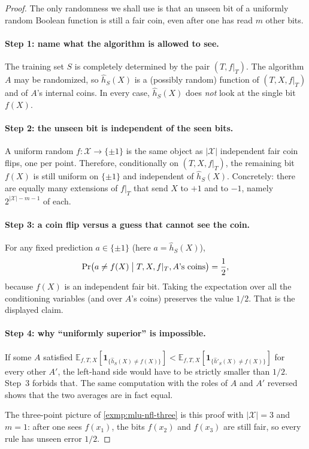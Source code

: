 \begin{proof}
The only randomness we shall use is that an unseen bit of a uniformly random Boolean function is still a fair coin, even after one has read $m$ other bits.

\paragraph{Step 1: name what the algorithm is allowed to see.}
The training set $S$ is completely determined by the pair $(T,f|_T)$. The algorithm $A$ may be randomized, so $\widehat h_S(X)$ is a (possibly random) function of $(T,X,f|_T)$ and of $A$'s internal coins. In every case, $\widehat h_S(X)$ does \emph{not} look at the single bit $f(X)$.

\paragraph{Step 2: the unseen bit is independent of the seen bits.}
A uniform random $f:\mathcal{X}\to\{\pm1\}$ is the same object as $\lvert\mathcal{X}\rvert$ independent fair coin flips, one per point. Therefore, conditionally on $(T,X,f|_T)$, the remaining bit $f(X)$ is still uniform on $\{\pm1\}$ and independent of $\widehat h_S(X)$. Concretely: there are equally many extensions of $f|_T$ that send $X$ to $+1$ and to $-1$, namely $2^{\lvert\mathcal{X}\rvert-m-1}$ of each.

\paragraph{Step 3: a coin flip versus a guess that cannot see the coin.}
For any fixed prediction $a\in\{\pm1\}$ (here $a=\widehat h_S(X)$),
\[
\Pr\bigl(a\ne f(X)\bigm|T,X,f|_T,A\text{'s coins}\bigr)
=
\frac12,
\]
because $f(X)$ is an independent fair bit. Taking the expectation over all the conditioning variables (and over $A$'s coins) preserves the value $1/2$. That is the displayed claim.

\paragraph{Step 4: why ``uniformly superior'' is impossible.}
If some $A$ satisfied $\mathbb{E}_{f,T,X}[\mathbf{1}_{\{\widehat h_S(X)\ne f(X)\}}]<\mathbb{E}_{f,T,X}[\mathbf{1}_{\{\widehat h'_S(X)\ne f(X)\}}]$ for every other $A'$, the left-hand side would have to be strictly smaller than $1/2$. Step~3 forbids that. The same computation with the roles of $A$ and $A'$ reversed shows that the two averages are in fact equal.

The three-point picture of \cref{exmp:mlu-nfl-three} is this proof with $\lvert\mathcal{X}\rvert=3$ and $m=1$: after one sees $f(x_1)$, the bits $f(x_2)$ and $f(x_3)$ are still fair, so every rule has unseen error $1/2$.
\end{proof}

